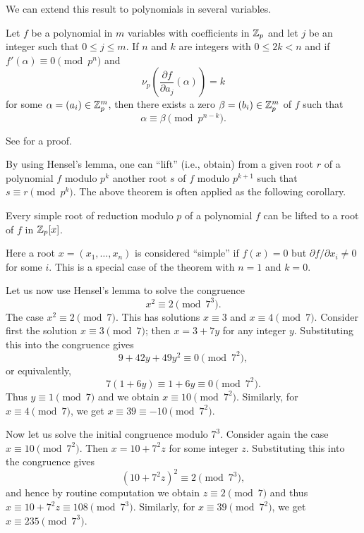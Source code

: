 \medskip

We can extend this result to polynomials in several variables.

\begin{theorem}
    Let \(f\) be a polynomial in \(m\) variables with coefficients in \(\mathbb{Z}_p\) and let \(j\) be an integer such that \(0 \leq j \leq m\). If \(n\) and \(k\) are integers with \(0 \leq 2k < n\) and if \(f'(\alpha) \equiv 0 \pmod{p^n}\) and
    \[
        \nu_p\left(\frac{\partial f}{\partial a_j}(\alpha)\right) = k
    \]
    for some \(\alpha = (a_i) \in \mathbb{Z}_p^m\), then there exists a zero \(\beta = (b_i) \in \mathbb{Z}_p^m\) of \(f\) such that
    \[
        \alpha \equiv \beta \pmod{p^{n-k}}.
    \]
\end{theorem}

See \cite[pp.~14--15]{serre2012course} for a proof.

\medskip

By using Hensel's lemma, one can ``lift'' (i.e., obtain) from a given root \(r\) of a polynomial \(f\) modulo \(p^k\) another root \(s\) of \(f\) modulo \(p^{k+1}\) such that \(s \equiv r \pmod{p^k}\). The above theorem is often applied as the following corollary.

\begin{corollary}
    Every simple root of reduction modulo \(p\) of a polynomial \(f\) can be lifted to a root of \(f\) in \(\mathbb{Z}_p[x]\).
\end{corollary}

Here a root \(x = (x_1, \dots, x_n)\) is considered ``simple'' if \(f(x) = 0\) but \(\partial f / \partial x_i \neq 0\) for some \(i\). This is a special case of the theorem with \(n = 1\) and \(k = 0\).

\smallskip

Let us now use Hensel's lemma to solve the congruence
\[
    x^2 \equiv 2 \pmod{7^3}.  
\]
The case \(x^2 \equiv 2 \pmod{7}\). This has solutions \(x \equiv 3\) and \(x \equiv 4 \pmod{7}\). Consider first the solution \(x \equiv 3 \pmod{7}\); then \(x = 3 + 7y\) for any integer \(y\). Substituting this into the congruence gives
\[
    9 + 42y + 49y^2 \equiv 0 \pmod{7^2},
\]
or equivalently,
\[
    7(1 + 6y) \equiv 1 + 6y \equiv 0 \pmod{7^2}.
\]
Thus \(y \equiv 1 \pmod{7}\) and we obtain \(x \equiv 10 \pmod{7^2}\). Similarly, for \(x \equiv 4 \pmod{7}\), we get \(x \equiv 39 \equiv -10 \pmod{7^2}\).

Now let us solve the initial congruence modulo \(7^3\). Consider again the case \(x \equiv 10 \pmod{7^2}\). Then \(x = 10 + 7^2z\) for some integer \(z\). Substituting this into the congruence gives
\[
    (10+7^2z)^2 \equiv 2 \pmod{7^3},
\]
and hence by routine computation we obtain \(z \equiv 2 \pmod{7}\) and thus \(x \equiv 10 + 7^2z \equiv 108 \pmod{7^3}\). Similarly, for \(x \equiv 39 \pmod{7^2}\), we get \(x \equiv 235 \pmod{7^3}\).

